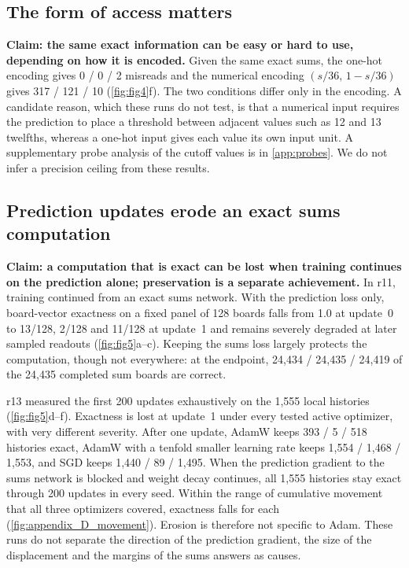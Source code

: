 \subsection{The form of access matters}\label{sec:res-encoding}


\textbf{Claim: the same exact information can be easy or hard to use,
depending on how it is encoded.} Given the same exact sums, the one-hot
encoding gives 0 / 0 / 2 misreads and the numerical encoding
$(s/36,\,1-s/36)$ gives 317 / 121 / 10 (\cref{fig:fig4}f). The two
conditions differ only in the encoding. A candidate reason, which these runs
do not test, is that a numerical input requires the prediction to place a
threshold between adjacent values such as 12 and 13 twelfths, whereas a
one-hot input gives each value its own input unit. A supplementary probe analysis of the cutoff values is in
\cref{app:probes}. We do not infer a precision ceiling from these results.

\subsection{Prediction updates erode an exact sums computation}\label{sec:res-erosion}

\textbf{Claim: a computation that is exact can be lost when training
continues on the prediction alone; preservation is a separate achievement.}
In r11, training continued from an exact sums network. With the prediction
loss only, board-vector exactness on a fixed panel of 128 boards falls from
1.0 at update~0 to 13/128, 2/128 and 11/128 at update~1 and remains
severely degraded at later sampled readouts
(\cref{fig:fig5}a--c). Keeping the sums loss largely protects the
computation, though not everywhere: at the endpoint, 24,434 / 24,435 /
24,419 of the 24,435 completed sum boards are correct.

r13 measured the first 200 updates exhaustively on the 1,555 local
histories (\cref{fig:fig5}d--f). Exactness is lost at update~1 under every
tested active optimizer, with very different severity. After one update,
AdamW keeps 393 / 5 / 518 histories exact, AdamW with a tenfold smaller
learning rate keeps 1,554 / 1,468 / 1,553, and SGD keeps 1,440 / 89 / 1,495.
When the prediction gradient to the sums network is blocked and weight decay
continues, all 1,555 histories stay exact through 200 updates in every seed.
Within the range of cumulative movement that all three optimizers covered,
exactness falls for each (\cref{fig:appendix_D_movement}). Erosion is therefore not
specific to Adam. These runs do not separate the direction of the prediction
gradient, the size of the displacement and the margins of the sums answers
as causes.

